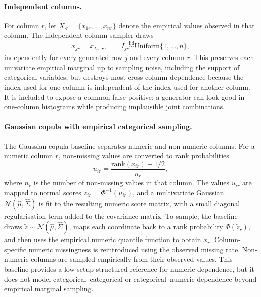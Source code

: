 \paragraph{Independent columns.}
For column $r$, let
$X_{\cdot r}=\{x_{1r},\ldots,x_{nr}\}$ denote the empirical values observed in
that column. The independent-column sampler draws
\[
  \widetilde{x}_{jr}
  =
  x_{I_{jr},r},
  \qquad
  I_{jr}\overset{\mathrm{iid}}{\sim}\mathrm{Uniform}\{1,\ldots,n\},
\]
independently for every generated row $j$ and every column $r$. This preserves
each univariate empirical marginal up to sampling noise, including the support
of categorical variables, but destroys most cross-column dependence because the
index used for one column is independent of the index used for another column.
It is included to expose a common false positive: a generator can look good in
one-column histograms while producing implausible joint combinations.

\paragraph{Gaussian copula with empirical categorical sampling.}
The Gaussian-copula baseline separates numeric and non-numeric columns. For a
numeric column $r$, non-missing values are converted to rank probabilities
\[
  u_{ir}=\frac{\mathrm{rank}(x_{ir})-1/2}{n_r},
\]
where $n_r$ is the number of non-missing values in that column. The values
$u_{ir}$ are mapped to normal scores
$z_{ir}=\Phi^{-1}(u_{ir})$, and a multivariate Gaussian
$\mathcal{N}(\widehat{\mu},\widehat{\Sigma})$ is fit to the resulting numeric
score matrix, with a small diagonal regularisation term added to the covariance
matrix. To sample, the baseline draws
$\widetilde{z}\sim\mathcal{N}(\widehat{\mu},\widehat{\Sigma})$, maps each
coordinate back to a rank probability $\Phi(\widetilde{z}_r)$, and then uses
the empirical numeric quantile function to obtain $\widetilde{x}_r$.
Column-specific numeric missingness is reintroduced using the observed missing
rate. Non-numeric columns are sampled empirically from their observed values.
This baseline provides a low-setup structured reference for numeric dependence,
but it does not model categorical--categorical or categorical--numeric
dependence beyond empirical marginal sampling.

